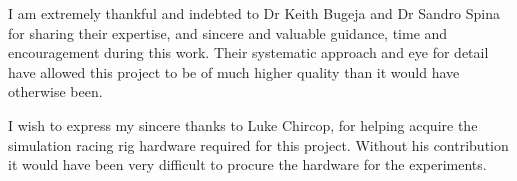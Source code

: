 \documentclass{report}
\begin{document}
I am extremely thankful and indebted to Dr Keith Bugeja and Dr Sandro Spina for sharing their expertise, and sincere and valuable guidance, time and encouragement during this work. Their systematic approach and eye for detail have allowed this project to be of much higher quality than it would have otherwise been. 

I wish to express my sincere thanks to Luke Chircop, for helping acquire the simulation racing rig hardware required for this project. Without his contribution it would have been very difficult to procure the hardware for the experiments.

\newpage
\tableofcontents

\newpage
\listoffigures
\listoftables

\newpage
{} 
\setcounter{page}{1}


\newpage


\newpage


\newpage


\newpage


\newpage


\newpage


\newpage
{}


\newpage
\setcounter{page}{1}
\begin{appendices}
	
\end{appendices}
\end{document}
